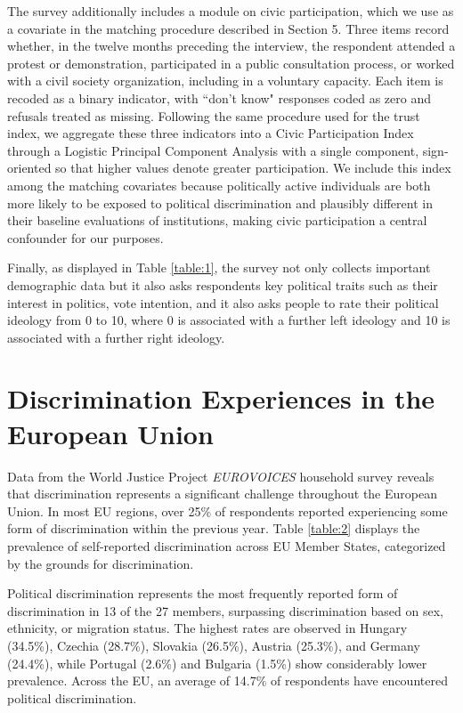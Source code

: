 \documentclass{article}
\begin{document}
The survey additionally includes a module on civic participation, which we use as a covariate in the matching procedure described in Section 5. Three items record whether, in the twelve months preceding the interview, the respondent attended a protest or demonstration, participated in a public consultation process, or worked with a civil society organization, including in a voluntary capacity. Each item is recoded as a binary indicator, with ``don't know" responses coded as zero and refusals treated as missing. Following the same procedure used for the trust index, we aggregate these three indicators into a Civic Participation Index through a Logistic Principal Component Analysis with a single component, sign-oriented so that higher values denote greater participation. We include this index among the matching covariates because politically active individuals are both more likely to be exposed to political discrimination and plausibly different in their baseline evaluations of institutions, making civic participation a central confounder for our purposes.

Finally, as displayed in Table \ref{table:1}, the survey not only collects important demographic data but it also asks respondents key political traits such as their interest in politics, vote intention, and it also asks people to rate their political ideology from 0 to 10, where 0 is associated with a further left ideology and 10 is associated with a further right ideology.

\section{Discrimination Experiences in the European Union}

Data from the World Justice Project \emph{EUROVOICES} household survey reveals that discrimination represents a significant challenge throughout the European Union. In most EU regions, over 25\% of respondents reported experiencing some form of discrimination within the previous year. Table \ref{table:2} displays the prevalence of self-reported discrimination across EU Member States, categorized by the grounds for discrimination.

Political discrimination represents the most frequently reported form of discrimination in 13 of the 27 members, surpassing discrimination based on sex, ethnicity, or migration status. The highest rates are observed in Hungary (34.5\%), Czechia (28.7\%), Slovakia (26.5\%), Austria (25.3\%), and Germany (24.4\%), while Portugal (2.6\%) and Bulgaria (1.5\%) show considerably lower prevalence. Across the EU, an average of 14.7\% of respondents have encountered political discrimination.
\end{document}
